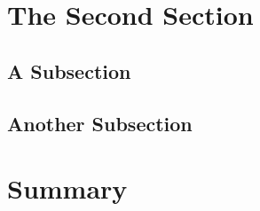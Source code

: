 \section{The Second Section}
\label{sec:second:second_sec}


\subsection{A Subsection}
\label{sec:second:second_sec:one}


\subsection{Another Subsection}
\label{sec:second:second_sec:two}


\section{Summary}
\label{sec:second:summary}

